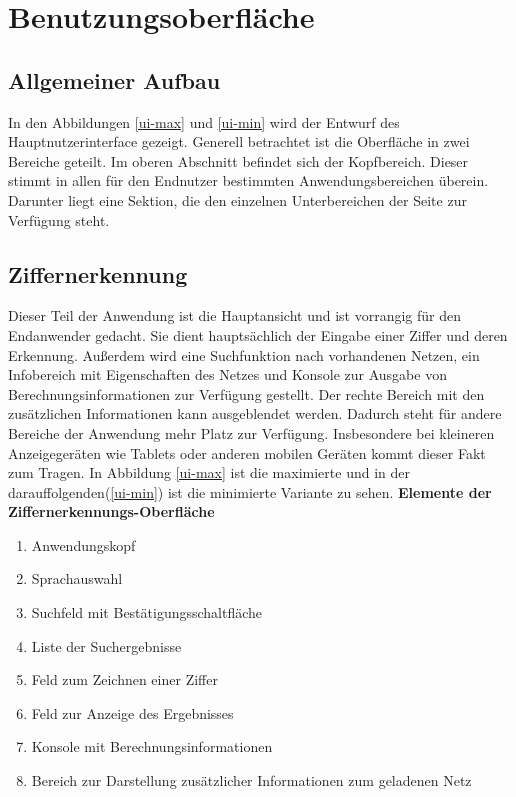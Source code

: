 \section{Benutzungsoberfläche}
\subsection{Allgemeiner Aufbau}
In den Abbildungen \ref{ui-max} und \ref{ui-min} wird der  Entwurf des Hauptnutzerinterface gezeigt. Generell betrachtet ist die Oberfläche in zwei Bereiche geteilt. Im oberen Abschnitt befindet sich der Kopfbereich. Dieser stimmt in allen für den Endnutzer bestimmten Anwendungsbereichen überein. Darunter liegt eine Sektion, die den einzelnen Unterbereichen der Seite zur Verfügung steht.

\subsection{Ziffernerkennung}
Dieser Teil der Anwendung ist die Hauptansicht und ist vorrangig für den Endanwender gedacht. Sie dient hauptsächlich der Eingabe einer Ziffer und deren Erkennung. Außerdem wird eine Suchfunktion nach vorhandenen Netzen, ein Infobereich mit Eigenschaften des Netzes und Konsole zur Ausgabe von Berechnungsinformationen zur Verfügung gestellt. Der rechte  Bereich mit den zusätzlichen Informationen kann ausgeblendet werden. Dadurch steht für andere Bereiche der Anwendung mehr Platz zur Verfügung. Insbesondere bei kleineren Anzeigegeräten wie Tablets oder anderen mobilen Geräten kommt dieser Fakt zum Tragen. In Abbildung \ref{ui-max} ist die maximierte und in der darauffolgenden(\ref{ui-min}) ist die minimierte Variante zu sehen.
\newpage 
 \textbf{Elemente der Ziffernerkennungs-Oberfläche}
 \begin{enumerate}
 	\item Anwendungskopf
 	\item Sprachauswahl
 	\item Suchfeld mit Bestätigungsschaltfläche
 	\item Liste der Suchergebnisse
 	\item Feld zum Zeichnen einer Ziffer
 	\item Feld zur Anzeige des Ergebnisses
 	\item Konsole mit Berechnungsinformationen
 	\item Bereich zur Darstellung zusätzlicher Informationen zum geladenen Netz
 \end{enumerate}
 
